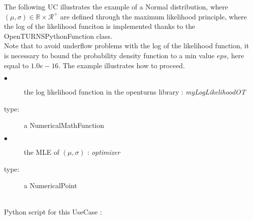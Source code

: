 The following UC illustrates the example of a Normal distribution, where $(\mu, \sigma) \in \mathbb{R} \times \mathcal{R}^+$ are defined through the maximum likelihood principle, where the log of the likelihood funciton  is implemented thanks to the OpenTURNSPythonFunction class.\\

Note that to avoid underflow problems with the log of the likelihood function, it is necessary to bound the probability density function to a min value $eps$, here equal to $1.0e-16$. The example illustrates how to proceed.\\


{
  \begin{description}
  \item[$\bullet$] the log likelihood function in the openturns library : {\itshape myLogLikelihoodOT}
  \item[type:] a NumericalMathFunction
  \item[$\bullet$] the  MLE of $(\mu, \sigma)$ : {\itshape optimizer}
  \item[type:] a NumericalPoint
  \end{description}
}

\textspace\\
Python script for this UseCase :

